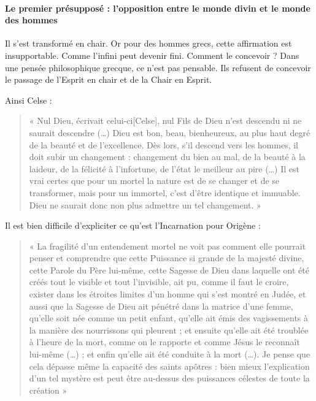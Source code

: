     \paragraph{Le premier présupposé : l'opposition entre le monde divin et le
      monde des hommes}
      Il s'est transformé en chair. Or pour des hommes grecs, cette affirmation est insupportable. Comme l'infini peut devenir fini.  Comment le concevoir ? Dans une pensée philosophique grecque, ce n'est pas pensable.
      Ils refusent de concevoir le passage de l'Esprit en chair et de la Chair en Esprit. 

Ainsi Celse  : 
\begin{quote}
    
« Nul Dieu, écrivait celui-ci[Celse], nul Fils de Dieu n'est descendu ni ne
saurait descendre (\ldots) Dieu est bon, beau, bienheureux, au plus haut
degré de la beauté et de l'excellence. Dès lors, s'il descend vers les
hommes, il doit subir un changement : changement du bien au mal, de la
beauté à la laideur, de la félicité à l'infortune, de l'état le meilleur
au pire (\ldots) Il est vrai certes que pour un mortel la nature est de
se changer et de se transformer, mais pour un immortel, c'est d'être
identique et immuable. Dieu ne saurait donc non plus admettre un tel
changement. » 
\end{quote}

Il est bien difficile d'expliciter ce qu'est l'Incarnation pour Origène : 
\begin{quote}
    « La fragilité d'un entendement mortel ne voit pas comment elle pourrait
penser et comprendre que cette Puissance si grande de la majesté divine,
cette Parole du Père lui-même, cette Sagesse de Dieu dans laquelle ont
été créés tout le visible et tout l'invisible, ait pu, comme il faut le
croire, exister dans les étroites limites d'un homme qui s'est montré en
Judée, et aussi que la Sagesse de Dieu ait pénétré dans la matrice d'une
femme, qu'elle soit née comme un petit enfant, qu'elle ait émis des
vagissements à la manière des nourrissons qui pleurent ; et ensuite
qu'elle ait été troublée à l'heure de la mort, comme on le rapporte et
comme Jésus le reconnaît lui-même (\ldots) ; et enfin qu'elle ait été
conduite à la mort (\ldots). Je pense que cela dépasse même la capacité
des saints apôtres : bien mieux l'explication d'un tel mystère est peut
être au-dessus des puissances célestes de toute la création » 
\end{quote}

